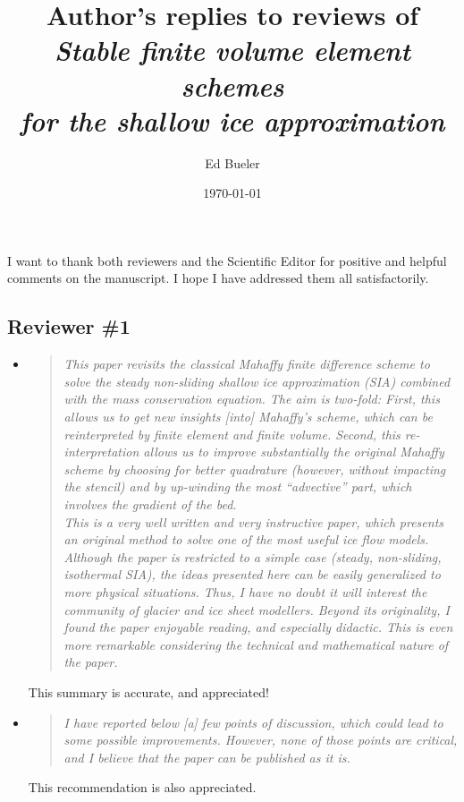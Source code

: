 \documentclass[11pt,reqno]{amsart}
\title[Author's replies to reviews of \emph{Stable finite volume element schemes \dots}]{Author's replies to reviews of \\ \emph{Stable finite volume element schemes} \\ \emph{for the shallow ice approximation}}
\author{Ed Bueler}
\date{\today}
\newcommand{\reply}[2]{
\medskip\medskip
\item  \begin{quote}
\emph{#1}
\end{quote}

\medskip
\noindent #2}
\begin{document}
\maketitle

\thispagestyle{empty}



I want to thank both reviewers and the Scientific Editor for positive and helpful comments on the manuscript.  I hope I have addressed them all satisfactorily.


\subsection*{Reviewer \#1}  \begin{itemize}
\reply{This paper revisits the classical Mahaffy finite difference scheme to solve the steady
non-sliding shallow ice approximation (SIA) combined with the mass conservation equation.  The aim is two-fold: First, this allows us to get new insights [into] Mahaffy's
scheme, which can be reinterpreted by finite element and finite volume. Second, this
re-interpretation allows us to improve substantially the original Mahaffy scheme by
choosing for better quadrature (however, without impacting the stencil) and by up-winding the most ``advective'' part, which involves the gradient of the bed.\\
This is a very well written and very instructive paper, which presents an original
method to solve one of the most useful ice flow models. Although the paper is restricted
to a simple case (steady, non-sliding, isothermal SIA), the ideas presented here can be
easily generalized to more physical situations. Thus, I have no doubt it will interest the
community of glacier and ice sheet modellers. Beyond its originality, I found the paper
enjoyable reading, and especially didactic. This is even more remarkable considering
the technical and mathematical nature of the paper.}
{This summary is accurate, and appreciated!}

\reply{I have reported below [a] few points of discussion, which could lead to some possible
improvements. However, none of those points are critical, and I believe that the paper
can be published as it is.}
{This recommendation is also appreciated.}


\end{itemize}
\end{document}
